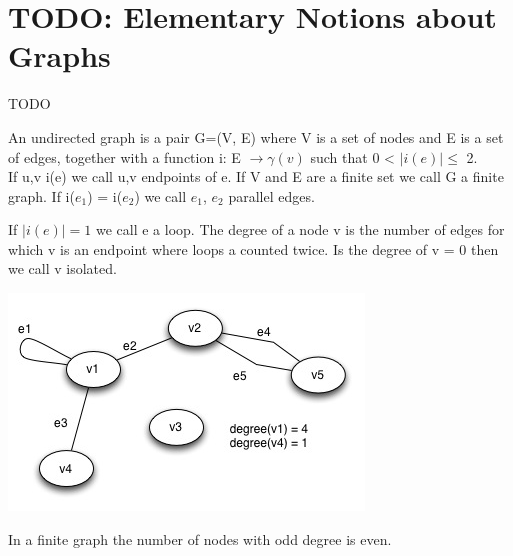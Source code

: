 \chapter{TODO: Elementary Notions about Graphs}

\begin{descr}
    TODO
\end{descr}


\begin{definition}
	An undirected graph is a pair G=(V, E) where V is a set of nodes and E is a set of edges, together with a function i: E $\rightarrow \gamma(v)$ such that 0 < $\mid i(e) \mid  \le $ 2.
\\
If u,v i(e) we call u,v endpoints of e. If V and E are a finite set we call G a finite graph. If i($e{_1}$) =  i($e{_2}$) we call  $e{_1}$, $e{_2}$ parallel edges.

If $\mid i(e) \mid = 1$ we call e a loop. The degree of a node v is the number of edges for which v is an endpoint where loops a counted twice.
Is the degree of v = 0 then we call v isolated.
\end{definition}

\begin{example*}
\includegraphics{diagrams/Chapter1_Example1.jpg} \\
\end{example*}

\begin{lemma}
    In a finite graph the number of nodes with odd degree is even.
\end{lemma}


